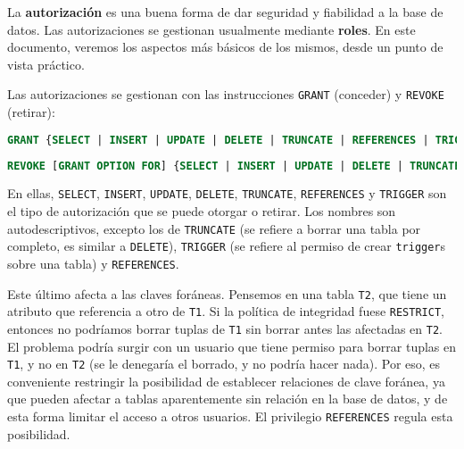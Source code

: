 \documentclass[12pt, a4paper]{article}
\title{\size{15pt}{Autorización y manejo de roles} \vspace{-2ex}}
\date{\vspace{-5ex}}
\begin{document}
\maketitle
\thispagestyle{empty}

\vspace{-10ex}

La \textbf{autorización} es una buena forma de dar seguridad y fiabilidad a la base de datos. Las autorizaciones se gestionan usualmente mediante \textbf{roles}. En este documento, veremos los aspectos más básicos de los mismos, desde un punto de vista práctico.

Las autorizaciones se gestionan con las instrucciones \texttt{GRANT} (conceder) y \texttt{REVOKE} (retirar):

\begin{center}
\begin{minipage}[c]{0,7\textwidth}
\begin{lstlisting}[language=SQL]
GRANT {SELECT | INSERT | UPDATE | DELETE | TRUNCATE | REFERENCES | TRIGGER | ALL PRIVILEGES} ON nombreTabla TO nombreRol [WITH GRANT OPTION];
\end{lstlisting}
\begin{lstlisting}[language=SQL]
REVOKE [GRANT OPTION FOR] {SELECT | INSERT | UPDATE | DELETE | TRUNCATE | REFERENCES | TRIGGER | ALL PRIVILEGES} ON nombreTabla FROM nombreRol [CASCADE | RESTRICT];
\end{lstlisting}
\end{minipage}
\end{center}

En ellas, \texttt{SELECT}, \texttt{INSERT}, \texttt{UPDATE}, \texttt{DELETE}, \texttt{TRUNCATE}, \texttt{REFERENCES} y \texttt{TRIGGER} son el tipo de autorización que se puede otorgar o retirar. Los nombres son autodescriptivos, excepto los de \texttt{TRUNCATE} (se refiere a borrar una tabla por completo, es similar a \texttt{DELETE}), \texttt{TRIGGER} (se refiere al permiso de crear \texttt{trigger}s sobre una tabla) y \texttt{REFERENCES}.

Este último afecta a las claves foráneas. Pensemos en una tabla \texttt{T2}, que tiene un atributo que referencia a otro de \texttt{T1}. Si la política de integridad fuese \texttt{RESTRICT}, entonces no podríamos borrar tuplas de \texttt{T1} sin borrar antes las afectadas en \texttt{T2}. El problema podría surgir con un usuario que tiene permiso para borrar tuplas en \texttt{T1}, y no en \texttt{T2} (se le denegaría el borrado, y no podría hacer nada). Por eso, es conveniente restringir la posibilidad de establecer relaciones de clave foránea, ya que pueden afectar a tablas aparentemente sin relación en la base de datos, y de esta forma limitar el acceso a otros usuarios. El privilegio \texttt{REFERENCES} regula esta posibilidad.
\end{document}
